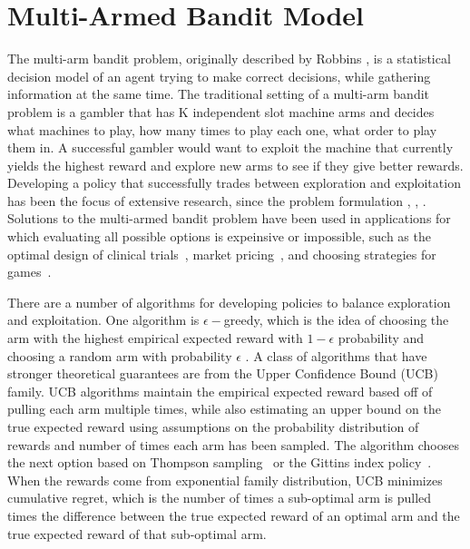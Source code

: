 \documentclass[letterpaper, 10 pt, conference]{ieeeconf}  %
\begin{document}
\section{Multi-Armed Bandit Model}
The multi-arm bandit problem, originally described by Robbins \cite{robbins1985some}, is a statistical decision model of an agent trying to make correct decisions, while gathering information at the same time.
The traditional setting of a multi-arm bandit problem is a gambler that has K independent slot machine arms and decides what machines to play, how many times to play each one, what order to play them in.
A successful gambler would want to exploit the machine that currently yields the highest reward and explore new arms to see if they give better rewards.
Developing a policy that successfully trades between exploration and exploitation has been the focus of extensive research, since the problem formulation \cite{bubeck2009pure}, \cite{robbins1952some}, \cite{bergemann2006bandit}. Solutions to the multi-armed bandit problem have been used in applications for which evaluating all possible options is expeinsive or impossible, such as the optimal design of clinical trials~\cite{simon1989optimal}, market pricing~\cite{rothschild1974two}, and choosing strategies for games~\cite{st2012online}. 

There are a number of algorithms for developing policies to balance exploration and exploitation.
One algorithm is $\epsilon-$greedy, which is the idea of choosing the arm with the highest empirical expected reward with $1-\epsilon$ probability and choosing a random arm with probability $\epsilon$ \cite{barto1998reinforcement}.
A class of algorithms that have stronger theoretical guarantees are from the Upper Confidence Bound (UCB) family.
UCB algorithms maintain the empirical expected reward based off of pulling each arm multiple times, while also estimating an upper bound on the true expected reward using assumptions on the probability distribution of rewards and number of times each arm has been sampled. 
The algorithm chooses the next option based on Thompson sampling~\cite{agrawal2011analysis} or the Gittins index policy~\cite{weber1992gittins}.
When the rewards come from exponential family distribution, UCB minimizes cumulative regret, which is the number of times a sub-optimal arm is pulled times the difference between the true expected reward of an optimal arm and the true expected reward of that sub-optimal arm.
\end{document}
